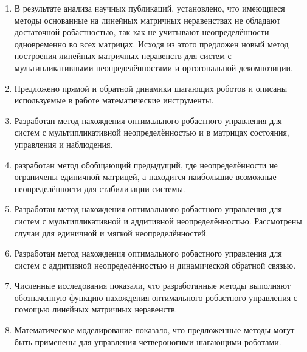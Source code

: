 \begin{enumerate}
  \item В результате анализа научных публикаций, установлено, что имеющиеся методы основанные на линейных матричных неравенствах не обладают достаточной робастностью, так как не учитывают неопределённости одновременно во всех матрицах. Исходя из этого предложен новый метод построения линейных матричных неравенств для систем с мультипликативными неопределённостями и ортогональной декомпозиции.  
  \item Предложено прямой и обратной динамики шагающих роботов и описаны используемые в работе математические инструменты.
  \item Разработан метод нахождения оптимального робастного управления для систем с мультипликативной неопределённостью и в матрицах состояния, управления и наблюдения. 
  \item разработан метод обобщающий предыдущий, где неопределённости не ограничены единичной матрицей, а находится наибольшие возможные неопределённости для стабилизации системы.
  \item Разработан метод нахождения оптимального робастного управления для систем с мультипликативной и аддитивной неопределённостью. Рассмотрены случаи для единичной и мягкой неопределённостей.
  \item Разработан метод нахождения оптимального робастного управления для систем с аддитивной неопределённостью и динамической обратной связью.
  \item Численные исследования показали, что разработанные методы выполняют обозначенную функцию нахождения оптимального робастного управления с помощью линейных матричных неравенств.
  \item Математическое моделирование показало, что предложенные методы могут быть применены для управления четвероногими шагающими роботами. 
\end{enumerate}
